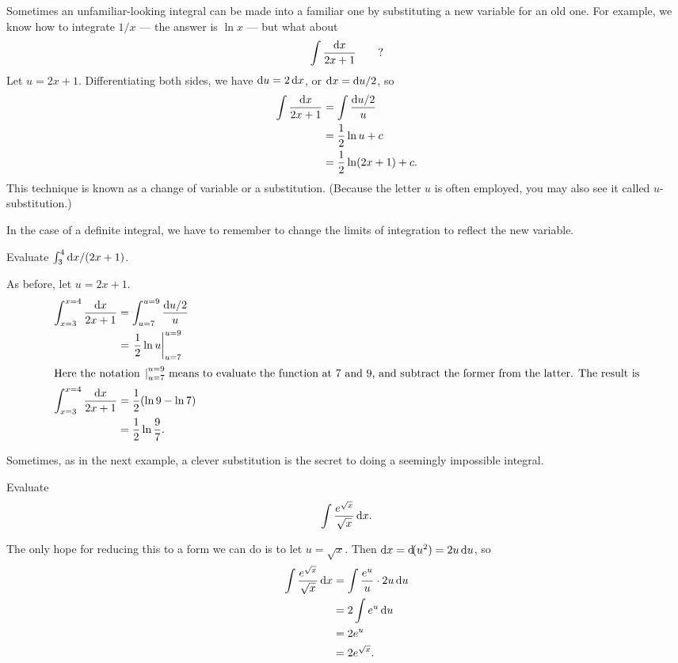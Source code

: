 Sometimes an unfamiliar-looking integral can be made into a familiar one by substituting 
a new variable for an old one. For example, we know how to integrate $1/x$ --- the answer
is $\ln x$ --- but what about
\begin{equation*}
  \int \frac{\operatorname{d\!} x}{2x+1}   \qquad ?
\end{equation*}
Let $u=2x+1$. Differentiating both sides, we have $\operatorname{d\!} u=2\operatorname{d\!} x$, or $\operatorname{d\!} x=\operatorname{d\!} u/2$, so
\begin{align*}
  \int \frac{\operatorname{d\!} x}{2x+1}   &= \int \frac{\operatorname{d\!} u/2}{u} \\
       &= \frac{1}{2}\ln u + c \\
       &= \frac{1}{2}\ln(2x+1) +c.
\end{align*}
This technique is known as a change of variable or a substitution. (Because the letter $u$ is often
employed, you may also see it called $u$-substitution.)

In the case of a definite integral, we have to remember to change the limits of integration
to reflect the new variable.

\begin{eg}
\egquestion Evaluate $\int_3^4 \operatorname{d\!} x/(2x+1)$.

\eganswer As before, let $u=2x+1$.
\begin{align*}
  \int_{x=3}^{x=4} \frac{\operatorname{d\!} x}{2x+1}   &= \int_{u=7}^{u=9} \frac{\operatorname{d\!} u/2}{u} \\
       &= \left.\frac{1}{2}\ln u\right|_{u=7}^{u=9} \\
\intertext{Here the notation $\left.\right|_{u=7}^{u=9}$ means to evaluate the function at
7 and 9, and subtract the former from the latter. The result is}
  \int_{x=3}^{x=4} \frac{\operatorname{d\!} x}{2x+1}  &= \frac{1}{2}(\ln 9-\ln 7) \\
            &=\frac{1}{2}\ln\frac{9}{7}.
\end{align*}
\end{eg}

Sometimes, as in the next example, a clever substitution is the secret to doing a
seemingly impossible integral.

\begin{eg}\label{eg:not-so-tricky}
\egquestion Evaluate
\begin{equation*}
  \int \frac{e^{\sqrt x}}{\sqrt x} \operatorname{d\!} x.
\end{equation*}

\eganswer The only hope for reducing this to a form we can do is to let
$u=\sqrt x$. Then $\operatorname{d\!} x=\operatorname{d\!}(u^2)=2u\operatorname{d\!} u$, so
\begin{align*}
  \int \frac{e^{\sqrt x}}{\sqrt x} \operatorname{d\!} x &=   \int \frac{e^u}{u} \cdot 2u\operatorname{d\!} u \\
             &= 2 \int e^u \operatorname{d\!} u \\
             &= 2e^u \\
             &= 2e^{\sqrt{x}}.
\end{align*}
\end{eg}

